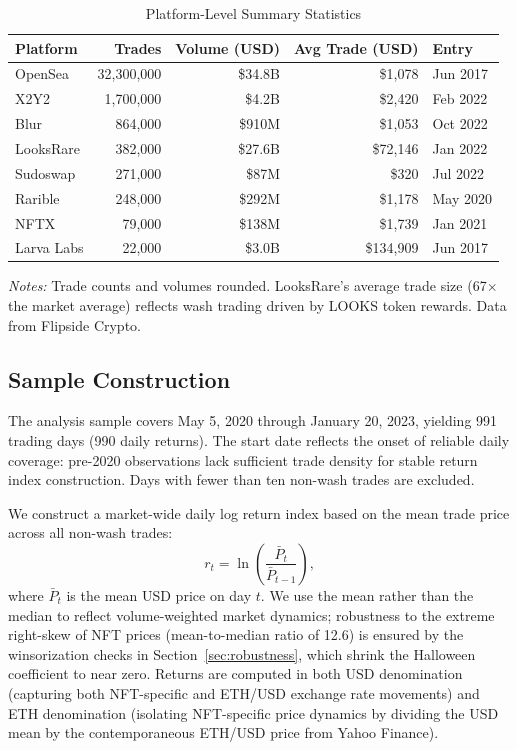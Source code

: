 \documentclass[12pt,a4paper]{article}
\begin{document}
\begin{table}[htbp]
\centering
\begin{threeparttable}
\caption{Platform-Level Summary Statistics}\label{tab:platform_stats}
\begin{tabular}{lrrrl}
\toprule
Platform & Trades & Volume (USD) & Avg Trade (USD) & Entry \\
\midrule
OpenSea   & 32,300,000 & \$34.8B & \$1,078 & Jun 2017 \\
X2Y2      &  1,700,000 & \$4.2B  & \$2,420 & Feb 2022 \\
Blur      &    864,000 & \$910M  & \$1,053 & Oct 2022 \\
LooksRare &    382,000 & \$27.6B & \$72,146 & Jan 2022 \\
Sudoswap  &    271,000 & \$87M   & \$320   & Jul 2022 \\
Rarible   &    248,000 & \$292M  & \$1,178 & May 2020 \\
NFTX      &     79,000 & \$138M  & \$1,739 & Jan 2021 \\
Larva Labs &    22,000 & \$3.0B  & \$134,909 & Jun 2017 \\
\bottomrule
\end{tabular}
\begin{tablenotes}
\small
\item \textit{Notes:} Trade counts and volumes rounded. LooksRare's average trade size (67$\times$ the market average) reflects wash trading driven by LOOKS token rewards. Data from Flipside Crypto.
\end{tablenotes}
\end{threeparttable}
\end{table}

\subsection{Sample Construction}

The analysis sample covers May 5, 2020 through January 20, 2023, yielding 991 trading days (990 daily returns). The start date reflects the onset of reliable daily coverage: pre-2020 observations lack sufficient trade density for stable return index construction. Days with fewer than ten non-wash trades are excluded.

We construct a market-wide daily log return index based on the mean trade price across all non-wash trades:
\begin{equation}\label{eq:return}
r_t = \ln\left(\frac{\bar{P}_t}{\bar{P}_{t-1}}\right),
\end{equation}
where $\bar{P}_t$ is the mean USD price on day $t$. We use the mean rather than the median to reflect volume-weighted market dynamics; robustness to the extreme right-skew of NFT prices (mean-to-median ratio of 12.6) is ensured by the winsorization checks in Section~\ref{sec:robustness}, which shrink the Halloween coefficient to near zero. Returns are computed in both USD denomination (capturing both NFT-specific and ETH/USD exchange rate movements) and ETH denomination (isolating NFT-specific price dynamics by dividing the USD mean by the contemporaneous ETH/USD price from Yahoo Finance).
\end{document}

